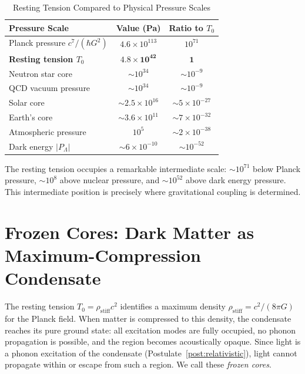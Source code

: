 \documentclass[11pt,a4paper]{article}
\newcommand{\rhostiff}{\ensuremath{\rho_{\mathrm{stiff}}}}
\newcommand{\Tzero}{\ensuremath{T_0}}
\theoremstyle{definition}
\theoremstyle{remark}
\begin{document}
\begin{table}[H]
\centering
\caption{Resting Tension Compared to Physical Pressure Scales}
\label{tab:pressure_comparison}
\begin{tabular}{@{}lcc@{}}
\toprule
\textbf{Pressure Scale} & \textbf{Value (Pa)} & \textbf{Ratio to $\Tzero$} \\
\midrule
Planck pressure $c^7/(\hbar G^2)$ & $4.6 \times 10^{113}$ & $10^{71}$ \\
\textbf{Resting tension $\Tzero$} & $\mathbf{4.8 \times 10^{42}}$ & $\mathbf{1}$ \\
Neutron star core & $\sim 10^{34}$ & $\sim 10^{-9}$ \\
QCD vacuum pressure & $\sim 10^{34}$ & $\sim 10^{-9}$ \\
Solar core & $\sim 2.5 \times 10^{16}$ & $\sim 5 \times 10^{-27}$ \\
Earth's core & $\sim 3.6 \times 10^{11}$ & $\sim 7 \times 10^{-32}$ \\
Atmospheric pressure & $10^5$ & $\sim 2 \times 10^{-38}$ \\
Dark energy $|P_\Lambda|$ & $\sim 6 \times 10^{-10}$ & $\sim 10^{-52}$ \\
\bottomrule
\end{tabular}
\end{table}

The resting tension occupies a remarkable intermediate scale: $\sim 10^{71}$ below Planck pressure, $\sim 10^8$ above nuclear pressure, and $\sim 10^{52}$ above dark energy pressure. This intermediate position is precisely where gravitational coupling is determined.

\section{Frozen Cores: Dark Matter as Maximum-Compression Condensate}
\label{sec:frozen_cores}

The resting tension $\Tzero = \rhostiff c^2$ identifies a maximum density $\rhostiff = c^2/(8\pi G)$ for the Planck field. When matter is compressed to this density, the condensate reaches its pure ground state: all excitation modes are fully occupied, no phonon propagation is possible, and the region becomes acoustically opaque. Since light is a phonon excitation of the condensate (Postulate~\ref{post:relativistic}), light cannot propagate within or escape from such a region. We call these \emph{frozen cores}.
\end{document}
